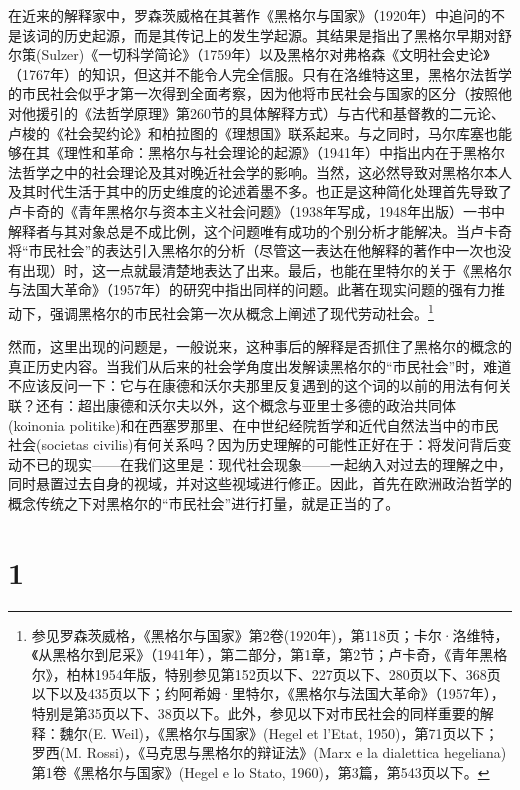 在近来的解释家中，罗森茨威格在其著作《黑格尔与国家》（1920年）中追问的不是该词的历史起源，而是其传记上的发生学起源。其结果是指出了黑格尔早期对舒尔策(Sulzer)《一切科学简论》（1759年）以及黑格尔对弗格森《文明社会史论》（1767年）的知识，但这并不能令人完全信服。只有在洛维特这里，黑格尔法哲学的市民社会似乎才第一次得到全面考察，因为他将市民社会与国家的区分（按照他对他援引的《法哲学原理》第260节的具体解释方式）与古代和基督教的二元论、卢梭的《社会契约论》和柏拉图的《理想国》联系起来。与之同时，马尔库塞也能够在其《理性和革命：黑格尔与社会理论的起源》（1941年）中指出内在于黑格尔法哲学之中的社会理论及其对晚近社会学的影响。当然，这必然导致对黑格尔本人及其时代生活于其中的历史维度的论述着墨不多。也正是这种简化处理首先导致了卢卡奇的《青年黑格尔与资本主义社会问题》（1938年写成，1948年出版）一书中解释者与其对象总是不成比例，这个问题唯有成功的个别分析才能解决。当卢卡奇将“市民社会”的表达引入黑格尔的分析（尽管这一表达在他解释的著作中一次也没有出现）时，这一点就最清楚地表达了出来。最后，也能在里特尔的关于《黑格尔与法国大革命》（1957年）的研究中指出同样的问题。此著在现实问题的强有力推动下，强调黑格尔的市民社会第一次从概念上阐述了现代劳动社会。\footnote{参见罗森茨威格，《黑格尔与国家》第2卷(1920年)，第118页；卡尔·洛维特，《从黑格尔到尼采》（1941年），第二部分，第1章，第2节；卢卡奇，《青年黑格尔》，柏林1954年版，特别参见第152页以下、227页以下、280页以下、368页以下以及435页以下；约阿希姆·里特尔，《黑格尔与法国大革命》（1957年），特别是第35页以下、38页以下。此外，参见以下对市民社会的同样重要的解释：魏尔(E. Weil)，《黑格尔与国家》(Hegel et l'Etat, 1950)，第71页以下；罗西(M. Rossi)，《马克思与黑格尔的辩证法》(Marx e la dialettica hegeliana)第1卷《黑格尔与国家》(Hegel e lo Stato, 1960)，第3篇，第543页以下。}

然而，这里出现的问题是，一般说来，这种事后的解释是否抓住了黑格尔的概念的真正历史内容。当我们从后来的社会学角度出发解读黑格尔的“市民社会”时，难道不应该反问一下：它与在康德和沃尔夫那里反复遇到的这个词的以前的用法有何关联？还有：超出康德和沃尔夫以外，这个概念与亚里士多德的政治共同体(koinonia politike)和在西塞罗那里、在中世纪经院哲学和近代自然法当中的市民社会(societas civilis)有何关系吗？因为历史理解的可能性正好在于：将发问背后变动不已的现实——在我们这里是：现代社会现象——一起纳入对过去的理解之中，同时悬置过去自身的视域，并对这些视域进行修正。因此，首先在欧洲政治哲学的概念传统之下对黑格尔的“市民社会”进行打量，就是正当的了。

\section*{1}

